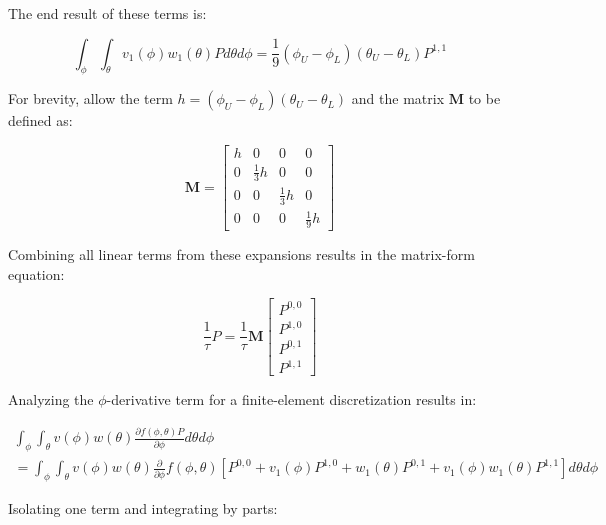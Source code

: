 \documentclass[12pt,a4paper,pagesize=pdftex]{scrartcl}
\begin{document}
The end result of these terms is:

\begin{equation*}
    \int_\phi \int_\theta v_1\left(\phi\right) w_1\left(\theta\right) P d\theta d\phi = \boxed{\frac{1}{9} \left(\phi_U - \phi_L\right) \left(\theta_U - \theta_L\right) P^{1,1}}
\end{equation*}

For brevity, allow the term \(h = \left(\phi_U - \phi_L\right) \left(\theta_U - \theta_L\right)\) and the matrix \(\mathbf{M}\) to be defined as:

\begin{equation*}
    \mathbf{M} =
    \begin{bmatrix}
        h & 0 & 0 & 0 \\
        0 & \frac{1}{3} h & 0 & 0 \\
        0 & 0 & \frac{1}{3} h & 0 \\
        0 & 0 & 0 & \frac{1}{9} h
    \end{bmatrix}
\end{equation*}

Combining all linear terms from these expansions results in the matrix-form equation:

\begin{equation*}
    \frac{1}{\tau} P = \frac{1}{\tau} \mathbf{M}
    \begin{bmatrix}
        P^{0,0} \\
        P^{1,0} \\
        P^{0,1} \\
        P^{1,1}
    \end{bmatrix}
\end{equation*}

Analyzing the \(\phi\)-derivative term for a finite-element discretization results in:

\begin{multline*}
    \int_\phi \int_\theta v\left(\phi\right) w\left(\theta\right) \frac{\partial f\left(\phi, \theta\right) P}{\partial \phi} d\theta d\phi \\
    = \int_\phi \int_\theta v\left(\phi\right) w\left(\theta\right) \frac{\partial}{\partial \phi} f\left(\phi, \theta\right) \left[P^{0,0} + v_1\left(\phi\right) P^{1,0} + w_1\left(\theta\right) P^{0,1} + v_1\left(\phi\right) w_1\left(\theta\right) P^{1,1}\right] d\theta d\phi
\end{multline*}

Isolating one term and integrating by parts:
\end{document}
